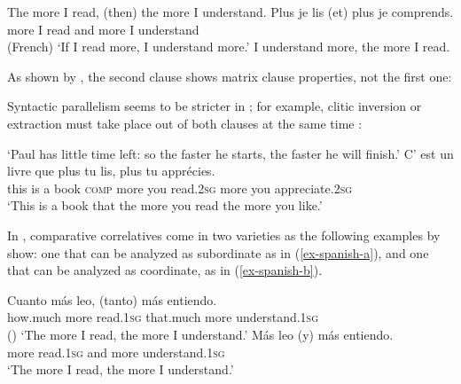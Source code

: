 \eal
\label{adjcc}
\ex The more I read, (then) the more I understand.
\ex 
\gll Plus je lis (et) plus je comprends.\\
     more I read \hphantom{(}and more I understand\\\hfill(French)
\glt `If I read more, I understand more.'
\ex I understand more, the more I read.
\zl


As shown by \citet[549--550]{culijack}, the second clause shows matrix clause properties, not the first one:

\eal
{}
\zl

Syntactic parallelism seems to be stricter in ; for example, clitic inversion or extraction
must take place out of both clauses at the same time \citep[]{Abeille:Borsley:08}:

\eal
\ex 
{}
\glt `Paul has little time left: so the faster he starts, the faster he will finish.'
\ex 
\gll C'   est un livre  que      plus   tu    lis, plus  tu    appr\'{e}cies. \\
     this is    a  book \textsc{comp} more you read.2\textsc{sg}  more you appreciate.2\textsc{sg} \\
\glt `This is a book that the more you read the more you like.'
\zl

\largerpage
In , comparative correlatives come in two varieties as the following examples by \citet[]{Abeille:Borsley:Espinal:06} show: one that can be analyzed as subordinate as in (\ref{ex-spanish-a}), and one that can be analyzed as coordinate, as in (\ref{ex-spanish-b}).

\eal
\label{spanishab}
\ex 
\label{ex-spanish-a}
\gll Cuanto   m\'{a}s leo,     (tanto)        m\'{a}s entiendo. \\
     how.much more    read.1\textsc{sg} \hphantom{(}that.much more understand.1\textsc{sg} \\\hfill{()}
\glt `The more I read, the more I understand.'
\ex 
\label{ex-spanish-b}
\gll	M\'{a}s leo        (y) m\'{a}s entiendo.\\
	more read.1\textsc{sg} \hphantom{(}and more understand.1\textsc{sg} \\
\glt `The more I read, the more I understand.'\\ 
\zl

